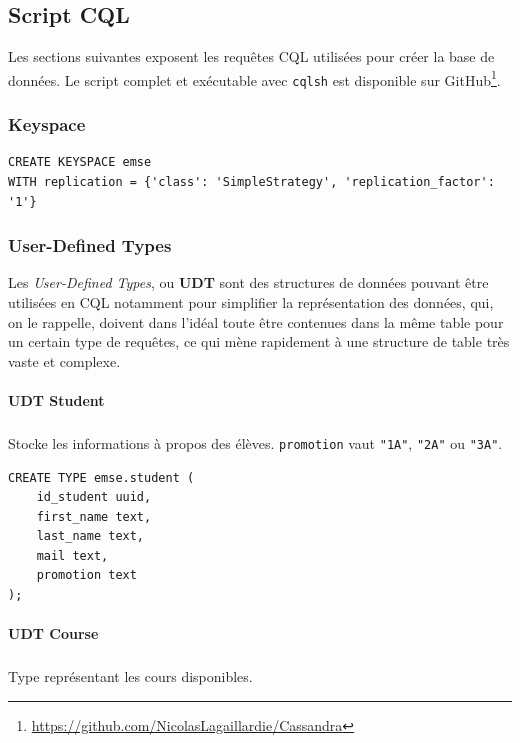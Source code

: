 \documentclass[a4paper, 11pt]{article}
\begin{document}
\subsection{Script CQL}
Les sections suivantes exposent les requêtes CQL utilisées pour créer la base de données. Le script complet et exécutable avec \texttt{cqlsh} est disponible sur GitHub\footnote{\url{https://github.com/NicolasLagaillardie/Cassandra}}.

\subsubsection{Keyspace}

\begin{tcolorbox}
\begin{lstlisting}
CREATE KEYSPACE emse
WITH replication = {'class': 'SimpleStrategy', 'replication_factor': '1'}
\end{lstlisting}
\end{tcolorbox}

\subsubsection{User-Defined Types}
Les \emph{User-Defined Types}, ou \textbf{UDT} sont des structures de données pouvant être utilisées en CQL notamment pour simplifier la représentation des données, qui, on le rappelle, doivent dans l'idéal toute être contenues dans la même table pour un certain type de requêtes, ce qui mène rapidement à une structure de table très vaste et complexe.


\paragraph{UDT Student}
\subparagraph{}
Stocke les informations à propos des élèves. \texttt{promotion} vaut \texttt{"1A"}, \texttt{"2A"} ou \texttt{"3A"}.

\begin{tcolorbox}
\begin{lstlisting}
CREATE TYPE emse.student (
    id_student uuid,
    first_name text,
    last_name text,
    mail text,
    promotion text
);
\end{lstlisting}
\end{tcolorbox}

\paragraph{UDT Course}
\subparagraph{}
Type représentant les cours disponibles.
\end{document}
